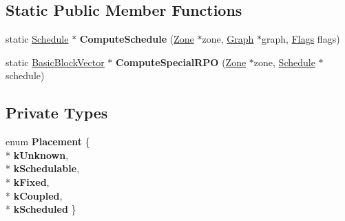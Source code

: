 \subsection*{Static Public Member Functions}
\begin{DoxyCompactItemize}
\item 
static \hyperlink{classv8_1_1internal_1_1compiler_1_1_schedule}{Schedule} $\ast$ {\bfseries Compute\+Schedule} (\hyperlink{classv8_1_1internal_1_1_zone}{Zone} $\ast$zone, \hyperlink{classv8_1_1internal_1_1compiler_1_1_graph}{Graph} $\ast$graph, \hyperlink{classv8_1_1base_1_1_flags}{Flags} flags)\hypertarget{classv8_1_1internal_1_1compiler_1_1_scheduler_a582cbc9e53e1ece9da23e9c395c84e7a}{}\label{classv8_1_1internal_1_1compiler_1_1_scheduler_a582cbc9e53e1ece9da23e9c395c84e7a}

\item 
static \hyperlink{classv8_1_1internal_1_1_zone_vector}{Basic\+Block\+Vector} $\ast$ {\bfseries Compute\+Special\+R\+PO} (\hyperlink{classv8_1_1internal_1_1_zone}{Zone} $\ast$zone, \hyperlink{classv8_1_1internal_1_1compiler_1_1_schedule}{Schedule} $\ast$schedule)\hypertarget{classv8_1_1internal_1_1compiler_1_1_scheduler_ab81197c5c4cb6682f54f8b983af0a7df}{}\label{classv8_1_1internal_1_1compiler_1_1_scheduler_ab81197c5c4cb6682f54f8b983af0a7df}

\end{DoxyCompactItemize}
\subsection*{Private Types}
\begin{DoxyCompactItemize}
\item 
enum {\bfseries Placement} \{ \\*
{\bfseries k\+Unknown}, 
\\*
{\bfseries k\+Schedulable}, 
\\*
{\bfseries k\+Fixed}, 
\\*
{\bfseries k\+Coupled}, 
\\*
{\bfseries k\+Scheduled}
 \}\hypertarget{classv8_1_1internal_1_1compiler_1_1_scheduler_ad74e5187da66584bb223b5e06f62d347}{}\label{classv8_1_1internal_1_1compiler_1_1_scheduler_ad74e5187da66584bb223b5e06f62d347}

\end{DoxyCompactItemize}
